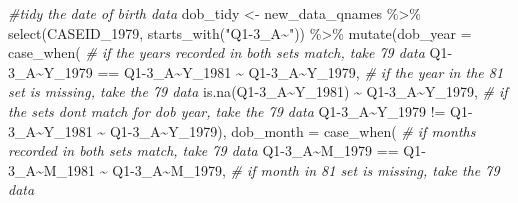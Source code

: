 \documentclass{article}
\newenvironment{Shaded}{\begin{snugshade}}{\end{snugshade}}
\newcommand{\AttributeTok}[1]{\textcolor[rgb]{0.77,0.63,0.00}{#1}}
\newcommand{\CommentTok}[1]{\textcolor[rgb]{0.56,0.35,0.01}{\textit{#1}}}
\newcommand{\FunctionTok}[1]{\textcolor[rgb]{0.00,0.00,0.00}{#1}}
\newcommand{\NormalTok}[1]{#1}
\newcommand{\OtherTok}[1]{\textcolor[rgb]{0.56,0.35,0.01}{#1}}
\newcommand{\SpecialCharTok}[1]{\textcolor[rgb]{0.00,0.00,0.00}{#1}}
\newcommand{\StringTok}[1]{\textcolor[rgb]{0.31,0.60,0.02}{#1}}
\begin{document}
\begin{Shaded}
\begin{Highlighting}[]
\CommentTok{\#tidy the date of birth data}
\NormalTok{dob\_tidy }\OtherTok{\textless{}{-}}\NormalTok{ new\_data\_qnames }\SpecialCharTok{\%\textgreater{}\%}
  \FunctionTok{select}\NormalTok{(CASEID\_1979,}
                \FunctionTok{starts\_with}\NormalTok{(}\StringTok{"Q1{-}3\_A\textasciitilde{}"}\NormalTok{)) }\SpecialCharTok{\%\textgreater{}\%}
  \FunctionTok{mutate}\NormalTok{(}\AttributeTok{dob\_year =} \FunctionTok{case\_when}\NormalTok{(}
                      \CommentTok{\# if the years recorded in both sets match, take 79 data}
                      \StringTok{\textasciigrave{}}\AttributeTok{Q1{-}3\_A\textasciitilde{}Y\_1979}\StringTok{\textasciigrave{}} \SpecialCharTok{==} \StringTok{\textasciigrave{}}\AttributeTok{Q1{-}3\_A\textasciitilde{}Y\_1981}\StringTok{\textasciigrave{}} \SpecialCharTok{\textasciitilde{}} \StringTok{\textasciigrave{}}\AttributeTok{Q1{-}3\_A\textasciitilde{}Y\_1979}\StringTok{\textasciigrave{}}\NormalTok{,}
                      \CommentTok{\# if the year in the 81 set is missing, take the 79 data}
                      \FunctionTok{is.na}\NormalTok{(}\StringTok{\textasciigrave{}}\AttributeTok{Q1{-}3\_A\textasciitilde{}Y\_1981}\StringTok{\textasciigrave{}}\NormalTok{) }\SpecialCharTok{\textasciitilde{}} \StringTok{\textasciigrave{}}\AttributeTok{Q1{-}3\_A\textasciitilde{}Y\_1979}\StringTok{\textasciigrave{}}\NormalTok{,}
                      \CommentTok{\# if the sets don\textquotesingle{}t match for dob year, take the 79 data}
                      \StringTok{\textasciigrave{}}\AttributeTok{Q1{-}3\_A\textasciitilde{}Y\_1979}\StringTok{\textasciigrave{}} \SpecialCharTok{!=} \StringTok{\textasciigrave{}}\AttributeTok{Q1{-}3\_A\textasciitilde{}Y\_1981}\StringTok{\textasciigrave{}} \SpecialCharTok{\textasciitilde{}} \StringTok{\textasciigrave{}}\AttributeTok{Q1{-}3\_A\textasciitilde{}Y\_1979}\StringTok{\textasciigrave{}}\NormalTok{),}
         \AttributeTok{dob\_month =} \FunctionTok{case\_when}\NormalTok{(}
                      \CommentTok{\# if months recorded in both sets match, take 79 data}
                      \StringTok{\textasciigrave{}}\AttributeTok{Q1{-}3\_A\textasciitilde{}M\_1979}\StringTok{\textasciigrave{}} \SpecialCharTok{==} \StringTok{\textasciigrave{}}\AttributeTok{Q1{-}3\_A\textasciitilde{}M\_1981}\StringTok{\textasciigrave{}} \SpecialCharTok{\textasciitilde{}} \StringTok{\textasciigrave{}}\AttributeTok{Q1{-}3\_A\textasciitilde{}M\_1979}\StringTok{\textasciigrave{}}\NormalTok{,}
                      \CommentTok{\# if month in 81 set is missing, take the 79 data}

\end{Highlighting}
\end{Shaded}
\end{document}
